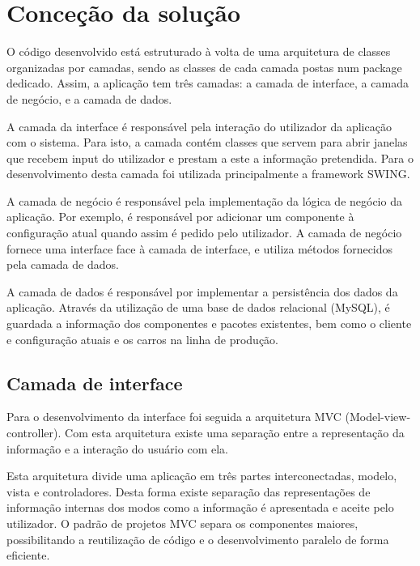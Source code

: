 \documentclass{llncs}
\begin{document}
\clearpage
\section{Conceção da solução} %

O código desenvolvido está estruturado à volta de uma arquitetura de classes organizadas por camadas, sendo as classes de cada camada postas num package dedicado. Assim, a aplicação tem três camadas: a camada de interface, a camada de negócio, e a camada de dados.

A camada da interface é responsável pela interação do utilizador da aplicação com o sistema. Para isto, a camada contém classes que servem para abrir janelas que recebem input do utilizador e prestam a este a informação pretendida. Para o desenvolvimento desta camada foi utilizada principalmente a framework SWING.

A camada de negócio é responsável pela implementação da lógica de negócio da aplicação. Por exemplo, é responsável por adicionar um componente à configuração atual quando assim é pedido pelo utilizador. A camada de negócio fornece uma interface face à camada de interface, e utiliza métodos fornecidos pela camada de dados.

A camada de dados é responsável por implementar a persistência dos dados da aplicação. Através da utilização de uma base de dados relacional (MySQL), é guardada a informação dos componentes e pacotes existentes, bem como o cliente e configuração atuais e os carros na linha de produção.

\subsection{Camada de interface}

Para o desenvolvimento da interface foi seguida a arquitetura MVC (Model-view-controller). Com esta arquitetura existe uma separação entre a representação da informação e a interação do usuário com ela.

Esta arquitetura divide uma aplicação em três partes interconectadas, modelo, vista e controladores. Desta forma existe separação das representações de informação internas dos modos como a informação é apresentada e aceite pelo utilizador. O padrão de projetos MVC separa os componentes maiores, possibilitando a reutilização de código e o desenvolvimento paralelo de forma eficiente. 
\end{document}
